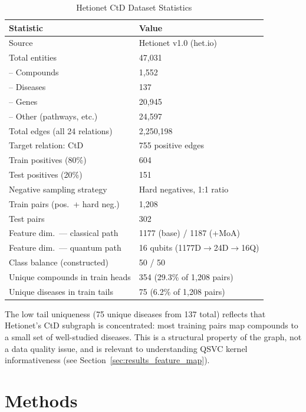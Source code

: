 \documentclass[twocolumn,10pt]{article}
\begin{document}
\begin{table}[t]
\centering
\caption{Hetionet CtD Dataset Statistics}
\label{tab:dataset}
\begin{tabular}{@{}ll@{}}
\toprule
\textbf{Statistic} & \textbf{Value} \\
\midrule
Source & Hetionet v1.0 (het.io) \\
Total entities & 47,031 \\
\quad-- Compounds & 1,552 \\
\quad-- Diseases & 137 \\
\quad-- Genes & 20,945 \\
\quad-- Other (pathways, etc.) & 24,597 \\
Total edges (all 24 relations) & 2,250,198 \\
Target relation: CtD & 755 positive edges \\
Train positives (80\%) & 604 \\
Test positives (20\%) & 151 \\
Negative sampling strategy & Hard negatives, 1:1 ratio \\
Train pairs (pos.\ + hard neg.) & 1,208 \\
Test pairs & 302 \\
Feature dim.\ --- classical path & 1177 (base) / 1187 (+MoA) \\
Feature dim.\ --- quantum path & 16 qubits (1177D$\to$24D$\to$16Q) \\
Class balance (constructed) & 50 / 50 \\
Unique compounds in train heads & 354 (29.3\% of 1,208 pairs) \\
Unique diseases in train tails & 75 (6.2\% of 1,208 pairs) \\
\bottomrule
\end{tabular}
\end{table}

The low tail uniqueness (75 unique diseases from 137 total) reflects that Hetionet's CtD subgraph is concentrated: most training pairs map compounds to a small set of well-studied diseases. This is a structural property of the graph, not a data quality issue, and is relevant to understanding QSVC kernel informativeness (see Section~\ref{sec:results_feature_map}).

\FloatBarrier
\section{Methods}
\end{document}
